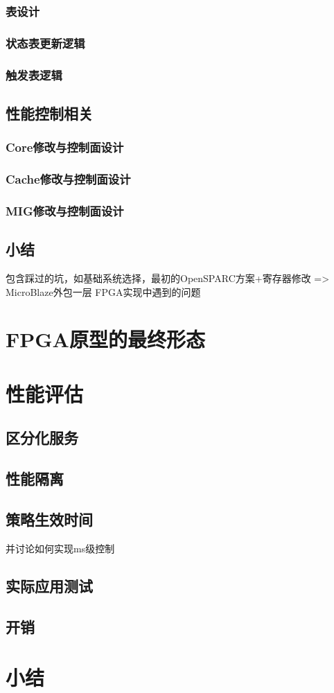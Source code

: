 \subsubsection*{表设计}
\subsubsection*{状态表更新逻辑}
\subsubsection*{触发表逻辑}


\subsection{性能控制相关}
\subsubsection*{Core修改与控制面设计}
\subsubsection*{Cache修改与控制面设计}
\subsubsection*{MIG修改与控制面设计}

\subsection{小结}
包含踩过的坑，如基础系统选择，最初的OpenSPARC方案+寄存器修改 => MicroBlaze外包一层
FPGA实现中遇到的问题

\section{FPGA原型的最终形态}

\section{性能评估}

\subsection{区分化服务}

\subsection{性能隔离}

\subsection{策略生效时间}

并讨论如何实现ms级控制

\subsection{实际应用测试}

\subsection{开销}


\section{小结}

